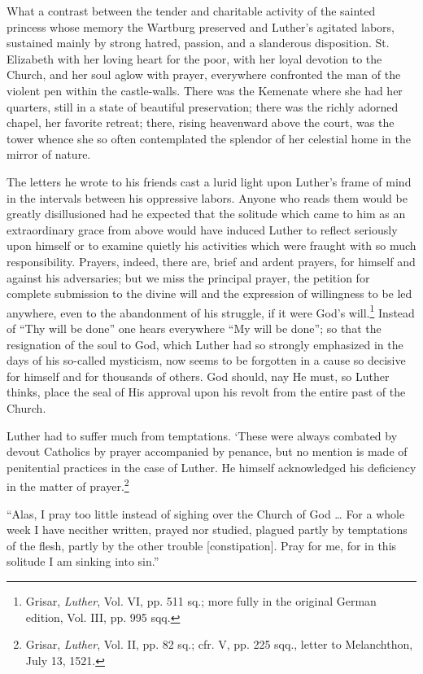 What a contrast between the tender and charitable activity of the
sainted princess whose memory the Wartburg preserved and Luther’s
agitated labors, sustained mainly by strong hatred, passion, and a
slanderous disposition. St. Elizabeth with her loving heart for the
poor, with her loyal devotion to the Church, and her soul aglow with
prayer, everywhere confronted the man of the violent pen within
the castle-walls. There was the Kemenate where she had her quarters,
still in a state of beautiful preservation; there was the richly adorned
chapel, her favorite retreat; there, rising heavenward above the court,
was the tower whence she so often contemplated the splendor of her
celestial home in the mirror of nature.

The letters he wrote to his friends cast a lurid light upon Luther’s
frame of mind in the intervals between his oppressive labors. Anyone
who reads them would be greatly disillusioned had he expected that
the solitude which came to him as an extraordinary grace from above
would have induced Luther to reflect seriously upon himself or to examine
quietly his activities which were fraught with so much responsibility.
Prayers, indeed, there are, brief and ardent prayers, for
himself and against his adversaries; but we miss the principal prayer,
the petition for complete submission to the divine will and the expression
of willingness to be led anywhere, even to the abandonment
of his struggle, if it were God’s will.\footnote
{Grisar, \textit{Luther}, Vol. VI, pp. 511 sq.; more fully in the original German edition, Vol.
III, pp. 995 sqq.}
Instead of “Thy will be
done” one hears everywhere “My will be done”; so that the resignation of
the soul to God, which Luther had so strongly emphasized in
the days of his so-called mysticism, now seems to be forgotten in a
cause so decisive for himself and for thousands of others. God should,
nay He must, so Luther thinks, place the seal of His approval upon
his revolt from the entire past of the Church.

Luther had to suffer much from temptations. ‘These were always
combated by devout Catholics by prayer accompanied by penance,
but no mention is made of penitential practices in the case of Luther.
He himself acknowledged his deficiency in the matter of prayer.\footnote
{Grisar, \textit{Luther}, Vol. II, pp. 82 sq.; cfr. V, pp. 225 sqq., letter to Melanchthon, July
13, 1521.}

“Alas, I pray too little instead of sighing over the Church of God \dots
For a whole week I have necither written, prayed nor studied, plagued
partly by temptations of the flesh, partly by the other trouble [constipation].
Pray for me, for in this solitude I am sinking into sin.”

